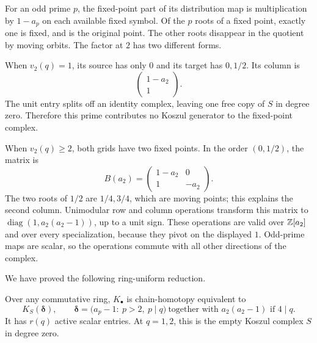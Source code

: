 For an odd prime $p$, the fixed-point part of its distribution map
is multiplication by $1-a_p$ on each available fixed symbol. Of the
$p$ roots of a fixed point, exactly one is fixed, and is the original
point. The other roots disappear in the quotient by moving orbits.
The factor at $2$ has two different forms.

When $v_2(q)=1$, its source has only $0$ and its target has $0,1/2$.
Its column is
\begin{equation}\label{ir:eq:two-column}
 \begin{pmatrix}1-a_2\\1\end{pmatrix}.
\end{equation}
The unit entry splits off an identity complex, leaving one free
copy of $S$ in degree zero. Therefore this prime contributes no
Koszul generator to the fixed-point complex.

When $v_2(q)\ge2$, both grids have two fixed points. In the order
$(0,1/2)$, the matrix is
\begin{equation}\label{ir:eq:two-matrix}
 B(a_2)=\begin{pmatrix}1-a_2&0\\1&-a_2\end{pmatrix}.
\end{equation}
The two roots of $1/2$ are $1/4,3/4$, which are moving points; this
explains the second column. Unimodular row and column operations
transform this matrix to $\operatorname{diag}(1,a_2(a_2-1))$, up to
a unit sign. These operations are valid over $\mathbb{Z}[a_2]$ and over
every specialization, because they pivot on the displayed $1$.
Odd-prime maps are scalar, so the operations commute with all other
directions of the complex.

We have proved the following ring-uniform reduction.
\begin{proposition}\label{ir:prop:fixed-koszul}
Over any commutative ring, $K_\bullet$ is chain-homotopy equivalent to
\begin{equation}\label{ir:eq:active-koszul}
 K_S(\boldsymbol\delta),\qquad
 \boldsymbol\delta=
 \bigl(a_p-1:\ p>2,\ p\mid q\bigr)
 \ \text{together with }a_2(a_2-1)\text{ if }4\mid q.
\end{equation}
It has $r(q)$ active scalar entries. At $q=1,2$, this is the empty
Koszul complex $S$ in degree zero.
\end{proposition}

